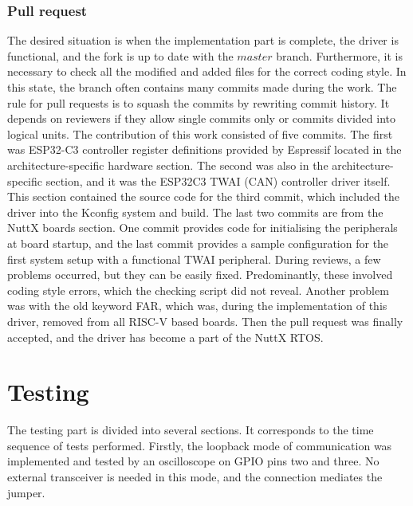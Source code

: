 \documentclass{ctuthesis}
\begin{document}
 \subsection{Pull request}
 The desired situation is when the implementation part is complete, the driver is functional, and the fork is up to date with the $master$ branch. Furthermore, it is necessary to check all the modified and added files for the correct coding style. In this state, the branch often contains many commits made during the work. The rule for pull requests is to squash the commits by rewriting commit history. It depends on reviewers if they allow single commits only or commits divided into logical units.
The contribution of this work consisted of five commits. The first was ESP32-C3 controller register definitions provided by Espressif located in the architecture-specific hardware section. The second was also in the architecture-specific section, and it was the ESP32C3 TWAI (CAN) controller driver itself. This section contained the source code for the third commit, which included the driver into the Kconfig system and build. The last two commits are from the NuttX boards section. One commit provides code for initialising the peripherals at board startup, and the last commit provides a sample configuration for the first system setup with a functional TWAI peripheral.
During reviews, a few problems occurred, but they can be easily fixed. Predominantly, these involved coding style errors, which the checking script did not reveal. Another problem was with the old keyword FAR, which was, during the implementation of this driver, removed from all RISC-V based boards. Then the pull request was finally accepted, and the driver has become a part of the NuttX RTOS.
 

\chapter{Testing}
\label{ch:testing}
 The testing part is divided into several sections. It corresponds to the time sequence of tests performed. Firstly, the loopback mode of communication was implemented and tested by an oscilloscope on GPIO pins two and three. No external transceiver is needed in this mode, and the connection mediates the jumper.
 
\end{document}
